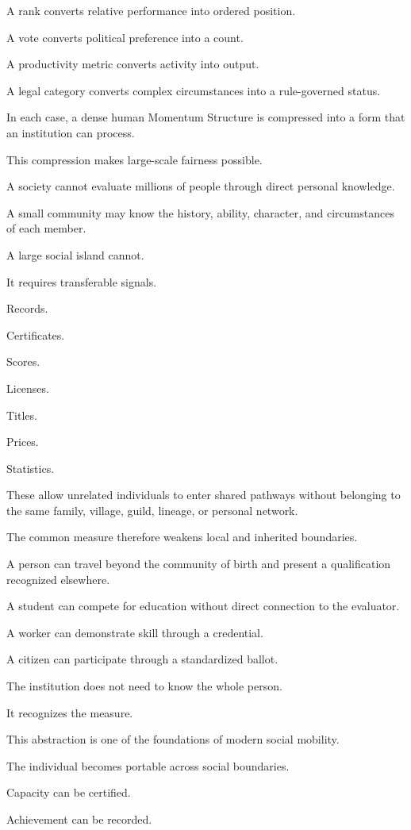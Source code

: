 A rank converts relative performance into ordered position.

A vote converts political preference into a count.

A productivity metric converts activity into output.

A legal category converts complex circumstances into a rule-governed status.

In each case, a dense human Momentum Structure is compressed into a form that an institution can process.

This compression makes large-scale fairness possible.

A society cannot evaluate millions of people through direct personal knowledge.

A small community may know the history, ability, character, and circumstances of each member.

A large social island cannot.

It requires transferable signals.

Records.

Certificates.

Scores.

Licenses.

Titles.

Prices.

Statistics.

These allow unrelated individuals to enter shared pathways without belonging to the same family, village, guild, lineage, or personal network.

The common measure therefore weakens local and inherited boundaries.

A person can travel beyond the community of birth and present a qualification recognized elsewhere.

A student can compete for education without direct connection to the evaluator.

A worker can demonstrate skill through a credential.

A citizen can participate through a standardized ballot.

The institution does not need to know the whole person.

It recognizes the measure.

This abstraction is one of the foundations of modern social mobility.

The individual becomes portable across social boundaries.

Capacity can be certified.

Achievement can be recorded.

